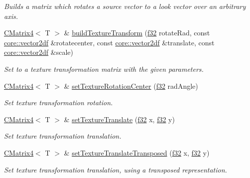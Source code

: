 \begin{DoxyCompactItemize}
\begin{DoxyCompactList}\small\item\em Builds a matrix which rotates a source vector to a look vector over an arbitrary axis. \end{DoxyCompactList}\item 
\hyperlink{classirr_1_1core_1_1CMatrix4}{C\+Matrix4}$<$ T $>$ \& \hyperlink{classirr_1_1core_1_1CMatrix4_afc72faaf2c883d9c0fdc1e0940d1acde}{build\+Texture\+Transform} (\hyperlink{namespaceirr_a0277be98d67dc26ff93b1a6a1d086b07}{f32} rotate\+Rad, const \hyperlink{namespaceirr_1_1core_a2cf08556d77f6f5a792973a6e27ed11b}{core\+::vector2df} \&rotatecenter, const \hyperlink{namespaceirr_1_1core_a2cf08556d77f6f5a792973a6e27ed11b}{core\+::vector2df} \&translate, const \hyperlink{namespaceirr_1_1core_a2cf08556d77f6f5a792973a6e27ed11b}{core\+::vector2df} \&scale)
\begin{DoxyCompactList}\small\item\em Set to a texture transformation matrix with the given parameters. \end{DoxyCompactList}\item 
\hyperlink{classirr_1_1core_1_1CMatrix4}{C\+Matrix4}$<$ T $>$ \& \hyperlink{classirr_1_1core_1_1CMatrix4_a445a7653292ae4ffb0baa50032a8674e}{set\+Texture\+Rotation\+Center} (\hyperlink{namespaceirr_a0277be98d67dc26ff93b1a6a1d086b07}{f32} rad\+Angle)
\begin{DoxyCompactList}\small\item\em Set texture transformation rotation. \end{DoxyCompactList}\item 
\hyperlink{classirr_1_1core_1_1CMatrix4}{C\+Matrix4}$<$ T $>$ \& \hyperlink{classirr_1_1core_1_1CMatrix4_a2bab9633697a892f08d89c7aeee6daf6}{set\+Texture\+Translate} (\hyperlink{namespaceirr_a0277be98d67dc26ff93b1a6a1d086b07}{f32} x, \hyperlink{namespaceirr_a0277be98d67dc26ff93b1a6a1d086b07}{f32} y)
\begin{DoxyCompactList}\small\item\em Set texture transformation translation. \end{DoxyCompactList}\item 
\hyperlink{classirr_1_1core_1_1CMatrix4}{C\+Matrix4}$<$ T $>$ \& \hyperlink{classirr_1_1core_1_1CMatrix4_a7d999210cc7427e9d744271e50d26c3c}{set\+Texture\+Translate\+Transposed} (\hyperlink{namespaceirr_a0277be98d67dc26ff93b1a6a1d086b07}{f32} x, \hyperlink{namespaceirr_a0277be98d67dc26ff93b1a6a1d086b07}{f32} y)
\begin{DoxyCompactList}\small\item\em Set texture transformation translation, using a transposed representation. \end{DoxyCompactList}\item 

\end{DoxyCompactItemize}
